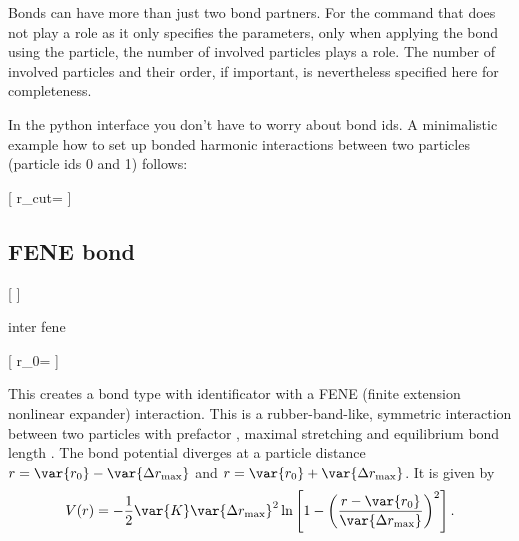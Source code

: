 Bonds can have more than just two bond partners. For the  command
that does not play a role as it only specifies the parameters, only when
applying the bond using the  particle, the number of involved
particles plays a role. The number of involved particles and their order, if
important, is nevertheless specified here for completeness.

In the python interface you don't have to worry about bond ids.
A minimalistic example how to set up bonded harmonic interactions between two particles (particle ids 0 and 1) follows:

\begin{pysyntax}
  [
    r_cut=
  ]
\end{pysyntax}

\subsection{FENE bond}

\begin{pysyntax}
  [
  ]
\end{pysyntax}

\begin{essyntax}
  inter 
  fene
    
\end{essyntax}
\begin{pysyntax}
 [
    r_0=
  ]
\end{pysyntax}

This creates a bond type with identificator  with a
FENE (finite extension nonlinear expander) interaction. This is a
rubber-band-like, symmetric interaction between two particles with
prefactor , maximal stretching  and
equilibrium bond length .  The bond potential diverges at a
particle distance $r=\var{r_0}-\var{\Delta r_\mathrm{max}}$ and
$r=\var{r_0}+\var{\Delta r_\mathrm{max}}$. It is given by
\begin{equation}
  V(r) = -\frac{1}{2} \var{K} \var{\Delta r_\mathrm{max}}^2\ln \left[ 1 - \left(
      \frac{r-\var{r_0}}{\var{\Delta r_\mathrm{max}}} \right)^2 \right].
\end{equation}

